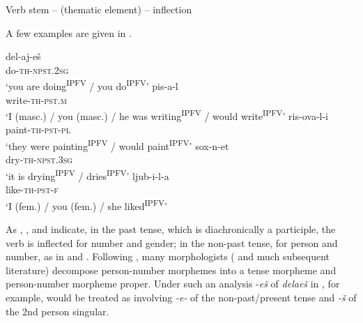 \documentclass[output=paper,colorlinks,citecolor=brown]{langscibook}
\begin{document}
\ea   Verb stem -- (thematic element) -- inflection\label{tat:ex:1}
\z 

A few examples are given in . 

\ea\label{tat:ex:2}
\ea \gll   del-aj-eš\\
    do-\textsc{th-npst.2sg}\\
\glt  `you are doing\textsuperscript{IPFV} / you do\textsuperscript{IPFV}'\label{ex:tatevosov:2a}
\ex \gll   pis-a-l \\
    write-\textsc{th-pst.m}\\
\glt  ‘I (masc.) / you (masc.) / he was writing\textsuperscript{IPFV} / would write\textsuperscript{IPFV}’\label{ex:tatevosov:2b}
\ex \gll   ris-ova-l-i \\
    paint-\textsc{th-pst-pl}\\
\glt  ‘they were painting\textsuperscript{IPFV} / would paint\textsuperscript{IPFV}’\label{ex:tatevosov:2c}
\ex \gll   sox-n-et \\
    dry-\textsc{th-npst.3sg}\\
\glt  ‘it is drying\textsuperscript{IPFV} / dries\textsuperscript{IPFV}’\label{ex:tatevosov:2d}
\ex \gll    ljub-i-l-a\\
    like-\textsc{th-pst-f}\\
\glt  ‘I (fem.) / you (fem.) / she liked\textsuperscript{IPFV}’\label{ex:tatevosov:2e}
\z
\z

\noindent As , , and  indicate, in the past tense, which is diachronically a participle, the verb is inflected for number and gender; in the non-past tense, for person and number, as  in  and . Following \citet{Jakobson1948}, many morphologists (\citealt{Halle1963,Lightner1965} and much subsequent literature) decompose person-number morphemes into a tense morpheme and person-number morpheme proper. Under such an analysis -\textit{eš} of \textit{delaeš} in , for example, would be treated as involving \textit{-e-} of the non-past/present tense and  \textit{-š} of the 2nd person singular.
\end{document}
